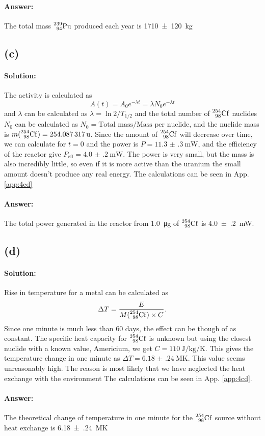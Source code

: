 \paragraph{Answer:} The total mass $\nuc{Pu}{239}{94}$ produced each year is \SI{1710(120)}{\kg}

\subsection*{(c)}
\paragraph{Solution:} The activity is calculated as
\begin{equation}
	A(t) = A_0 e^{-\lambda t} = \lambda N_0 e^{-\lambda t}
\end{equation}
and $\lambda$ can be calculated as $\lambda = \ln{2} / T_{1/2}$ and the total number of $\nuc{Cf}{254}{98}$ nuclides $N_0$ can be calculated as $N_0 = \text{Total mass} / \text{Mass per nuclide}$, and the nuclide mass is $m(\nuc{Cf}{254}{98}) = \SI{254.087317}{u}$. Since the amount of $\nuc{Cf}{254}{98}$ will decrease over time, we can calculate for $t=0$ and the power is $P = \SI{11.3(3)}{\milli\watt}$, and the efficiency of the reactor give $P_\textrm{eff} = \SI{4.0(2)}{\milli\watt}$. The power is very small, but the mass is also incredibly little, so even if it is more active than the uranium the small amount doesn't produce any real energy. The calculations can be seen in App. \ref{app:4cd}

\paragraph{Answer:} The total power generated in the reactor from \SI{1.0}{\micro\gram} of $\nuc{Cf}{254}{98}$ is \SI{4.0(2)}{\milli\watt}.

\subsection*{(d)}
\paragraph{Solution:} Rise in temperature for a metal can be calculated as 
\begin{equation}
	\Delta T = \frac{E}{M(\nuc{Cf}{254}{98}) \times C}.
\end{equation}
Since one minute is much less than 60 days, the effect can be though of as constant. The specific heat capacity for $\nuc{Cf}{254}{98}$ is unknown but using the closest nuclide with a known value, Americium, we get $C = \SI{110}{\joule\per\kg\per\kelvin}$. This gives the temperature change in one minute as $\Delta T = \SI{6.18(24)}{\mega\kelvin}$. This value seems unreasonably high. The reason is most likely that we have neglected the heat exchange with the environment  The calculations can be seen in App. \ref{app:4cd}.

\paragraph{Answer:} The theoretical change of temperature in one minute for the  $\nuc{Cf}{254}{98}$ source without heat exchange is \SI{6.18(24)}{\mega\kelvin}